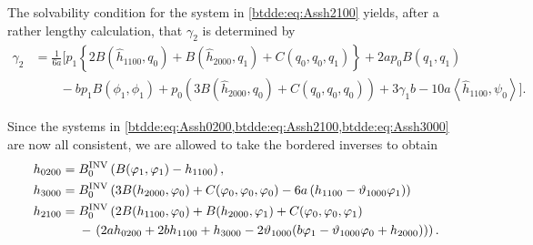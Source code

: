 The solvability condition for the system in \cref{btdde:eq:Assh2100} yields, after a
rather lengthy calculation, that $\gamma_2$ is determined by 
\begin{align}
\label{btdde:eq:gamma_2}
\gamma_2 &= \frac1{6a} 
\bigg[ p_1\left\{ 2 B(\hat h_{1100},q_0) + B(\hat h_{2000},q_1) + C(q_0,q_0,q_1) \right\} 
        +2a p_0 B(q_1,q_1)  \nonumber \\
	& \qquad - b p_1 B(\phi_1,\phi_1) + p_0 \left( 3B(\hat h_{2000},q_0) + C(q_0,q_0,q_0) \right) 
    + 3 \gamma_1 b - 10 a \left< \hat h_{1100}, \psi_0 \right> \bigg]. \nonumber 
\end{align}

Since the systems in \cref{btdde:eq:Assh0200,btdde:eq:Assh2100,btdde:eq:Assh3000} are now all consistent,
we are allowed to take the bordered inverses to obtain
\begin{align*}
h_{0200} ={}& B^{\mathrm{INV}}_{0} \left(B(\varphi_1,\varphi_1) - h_{1100}\right), \\
h_{3000} ={}& B^{\mathrm{INV}}_{0} \left(3 B(h_{2000},\varphi_0) + C(\varphi_0,\varphi_0,\varphi_0)
                 - 6a \left( h_{1100} - \vartheta_{1000} \varphi_1 \right)\right) \\
h_{2100} ={}& B^{\mathrm{INV}}_{0} \left(2 B(h_{1100},\varphi_0) + B(h_{2000},\varphi_1) + C(\varphi_0,\varphi_0,\varphi_1) \right. \\
                         & - \left.\left( 2 a h_{0200} + 2 b h_{1100} + h_{3000} 
                            - 2 \vartheta_{1000} (b\varphi_1 - \vartheta_{1000}\varphi_0 +h_{2000})\right)\right).
\end{align*}


